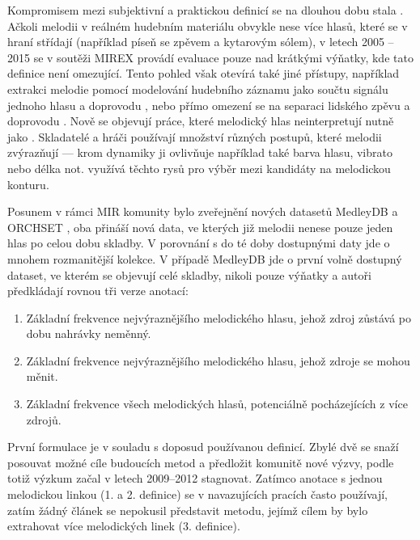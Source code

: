 Kompromisem mezi subjektivní a praktickou definicí se na dlouhou dobu stala . Ačkoli melodii v reálném hudebním materiálu obvykle nese více hlasů, které se v hraní střídají (například píseň se zpěvem a kytarovým sólem), v letech 2005 -- 2015 se v soutěži MIREX provádí evaluace pouze nad krátkými výňatky, kde tato definice není omezující. Tento pohled však otevírá také jiné přístupy, například extrakci melodie pomocí modelování hudebního záznamu jako součtu signálu jednoho hlasu a doprovodu \citep{Durrieu2010}, \citep{Bosch2016b} nebo přímo omezení se na separaci lidského zpěvu a doprovodu \citep{Ikemiya2016}. Nově se objevují práce, které  melodický hlas neinterpretují nutně jako . Skladatelé a hráči používají množství různých postupů, které melodii zvýrazňují --- krom dynamiky ji ovlivňuje například také barva hlasu, vibrato nebo délka not. \cite{Salamon2012a} využívá těchto rysů pro výběr mezi kandidáty na melodickou konturu.

Posunem v rámci MIR komunity bylo zveřejnění nových datasetů MedleyDB \citep{Bittner2014} a ORCHSET \citep{Bosch2016}, oba přináší nová data, ve kterých již melodii nenese pouze jeden hlas po celou dobu skladby. V porovnání s do té doby dostupnými daty jde o mnohem rozmanitější kolekce. V případě MedleyDB jde o první volně dostupný dataset, ve kterém se objevují celé skladby, nikoli pouze výňatky a autoři předkládají rovnou tři verze anotací:

\begin{enumerate}
    \item Základní frekvence nejvýraznějšího melodického hlasu, jehož zdroj zůstává po dobu nahrávky neměnný.
    \item Základní frekvence nejvýraznějšího melodického hlasu, jehož zdroje se mohou měnit.
    \item Základní frekvence všech melodických hlasů, potenciálně pocházejících z více zdrojů.
\end{enumerate}

První formulace je v souladu s doposud používanou definicí. Zbylé dvě se snaží posouvat možné cíle budoucích metod a předložit komunitě nové výzvy, podle \cite{Salamon2014} totiž výzkum začal v letech 2009--2012 stagnovat. Zatímco anotace s jednou melodickou linkou (1. a 2. definice) se v navazujících pracích často používají, zatím žádný článek se nepokusil představit metodu, jejímž cílem by bylo extrahovat více melodických linek (3. definice).

